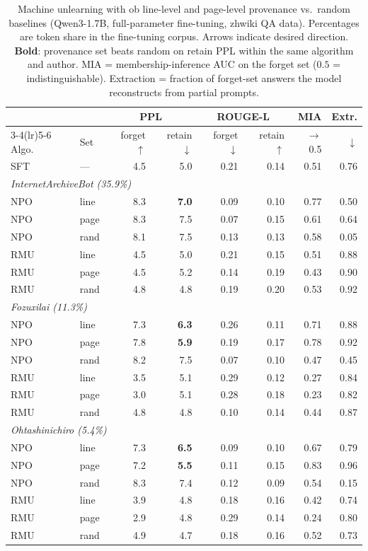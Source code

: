 \begin{table}[t]
	\centering
	\footnotesize
	\caption{Machine unlearning with ob line-level and page-level provenance vs.\ random baselines (Qwen3-1.7B, full-parameter fine-tuning, zhwiki QA data). Percentages are token share in the fine-tuning corpus. Arrows indicate desired direction. \textbf{Bold}: provenance set beats random on retain PPL within the same algorithm and author. MIA = membership-inference AUC on the forget set ($0.5$ = indistinguishable). Extraction = fraction of forget-set answers the model reconstructs from partial prompts.}
	\label{tab:unlearning}
	\setlength{\tabcolsep}{2pt}
	\begin{tabular}{@{}llrrrrrr@{}}
		\toprule
		& & \multicolumn{2}{c}{PPL} & \multicolumn{2}{c}{ROUGE-L} & MIA & Extr. \\
		\cmidrule(lr){3-4}\cmidrule(lr){5-6}
		Algo. & Set & forget $\uparrow$ & retain $\downarrow$ & forget $\downarrow$ & retain $\uparrow$ & $\to$0.5 & $\downarrow$ \\
		\midrule
		SFT & --- & 4.5 & 5.0 & 0.21 & 0.14 & 0.51 & 0.76 \\
		\midrule
		\multicolumn{8}{l}{\textit{InternetArchiveBot (35.9\%)}}\\
		NPO & line  & 8.3 & \textbf{7.0} & 0.09 & 0.10 & 0.77 & 0.50 \\
		NPO & page  & 8.3 & 7.5 & 0.07 & 0.15 & 0.61 & 0.64 \\
		NPO & rand  & 8.1 & 7.5 & 0.13 & 0.13 & 0.58 & 0.05 \\
		RMU & line  & 4.5 & 5.0 & 0.21 & 0.15 & 0.51 & 0.88 \\
		RMU & page  & 4.5 & 5.2 & 0.14 & 0.19 & 0.43 & 0.90 \\
		RMU & rand  & 4.8 & 4.8 & 0.19 & 0.20 & 0.53 & 0.92 \\
		\midrule
		\multicolumn{8}{l}{\textit{Fozuxilai (11.3\%)}}\\
		NPO & line  & 7.3 & \textbf{6.3} & 0.26 & 0.11 & 0.71 & 0.88 \\
		NPO & page  & 7.8 & \textbf{5.9} & 0.19 & 0.17 & 0.78 & 0.92 \\
		NPO & rand  & 8.2 & 7.5 & 0.07 & 0.10 & 0.47 & 0.45 \\
		RMU & line  & 3.5 & 5.1 & 0.29 & 0.12 & 0.27 & 0.84 \\
		RMU & page  & 3.0 & 5.1 & 0.28 & 0.18 & 0.23 & 0.82 \\
		RMU & rand  & 4.8 & 4.8 & 0.10 & 0.14 & 0.44 & 0.87 \\
		\midrule
		\multicolumn{8}{l}{\textit{Ohtashinichiro (5.4\%)}}\\
		NPO & line  & 7.3 & \textbf{6.5} & 0.09 & 0.10 & 0.67 & 0.79 \\
		NPO & page  & 7.2 & \textbf{5.5} & 0.11 & 0.15 & 0.83 & 0.96 \\
		NPO & rand  & 8.3 & 7.4 & 0.12 & 0.09 & 0.54 & 0.15 \\
		RMU & line  & 3.9 & 4.8 & 0.18 & 0.16 & 0.42 & 0.74 \\
		RMU & page  & 2.9 & 4.8 & 0.29 & 0.14 & 0.24 & 0.80 \\
		RMU & rand  & 4.9 & 4.7 & 0.18 & 0.16 & 0.52 & 0.73 \\
		\bottomrule
	\end{tabular}
\end{table}
